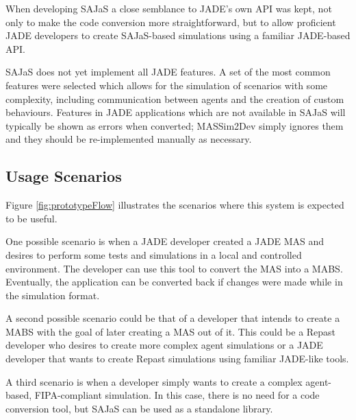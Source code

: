 \documentclass[a4paper,twoside]{article}
\begin{document}
When developing SAJaS a close semblance to JADE's own API was kept, not only to make the code conversion more straightforward, but to allow proficient JADE developers to create SAJaS-based simulations using a familiar JADE-based API.

SAJaS does not yet implement all JADE features. A set of the most common features were selected which allows for the simulation of scenarios with some complexity, including communication between agents and the creation of custom behaviours. Features in JADE applications which are not available in SAJaS will typically be shown as errors when converted; MASSim2Dev simply ignores them and they should be re-implemented manually as necessary.

\subsection{Usage Scenarios}
\label{sec:solution-scenarios}
Figure \ref{fig:prototypeFlow} illustrates the scenarios where this system is expected to be useful.

One possible scenario is when a JADE developer created a JADE MAS and desires to perform some tests and simulations in a local and controlled environment. The developer can use this tool to convert the MAS into a MABS. Eventually, the application can be converted back if changes were made while in the simulation format.

A second possible scenario could be that of a developer that intends to create a MABS with the goal of later creating a MAS out of it. This could be a Repast developer who desires to create more complex agent simulations or a JADE developer that wants to create Repast simulations using familiar JADE-like tools.

A third scenario is when a developer simply wants to create a complex agent-based, FIPA-compliant simulation. In this case, there is no need for a code conversion tool, but SAJaS can be used as a standalone library.
\end{document}
